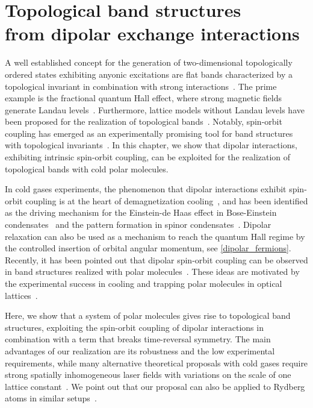 \chapter[Topological band structures from dipolar exchange interactions]{Topological band structures\texorpdfstring{\\}{ }from dipolar exchange interactions}
\label{topological_bands}

A well established concept for the generation of two-dimensional topologically ordered states exhibiting anyonic excitations are flat bands characterized by a topological invariant in combination with strong interactions~\cite{Bergholtz2013,Parameswaran2013}.
The prime example is the fractional quantum Hall effect, where strong magnetic fields generate Landau levels~\cite{Nayak2008}.
Furthermore, lattice models without Landau levels have been proposed for the realization of topological bands~\cite{Haldane1988,Raghu2008,Wang2011,Neupert2011,Wang2012a,Grushin2012,Moller2009,Sun2010,Barkeshli2012,Wang2011a,Sterdyniak2013,Liu2012,Yao2013,Yang2012,Dauphin2012,Cooper2012,Cooper2013,Shi2013,Yao2015}.
Notably, spin-orbit coupling has emerged as an experimentally promising tool for band structures with topological invariants~\cite{Kane2005,Pesin2009,Qi2011,Hasan2010,Tang2011,Qiao2011}.
In this chapter, we show that dipolar interactions, exhibiting intrinsic spin-orbit coupling, can be exploited for the realization of topological bands with cold polar molecules.

In cold gases experiments, the phenomenon that dipolar interactions exhibit spin-orbit coupling is at the heart of demagnetization cooling~\cite{Hensler2003,Fattori2006,Pasquiou2011,DePaz2013a},
and has been identified as the driving mechanism for the Einstein-de Haas effect in Bose-Einstein condensates~\cite{Kawaguchi2006} and the pattern formation in spinor condensates~\cite{Santos2006,Vengalattore2008,Kurn2013}.
Dipolar relaxation can also be used as a mechanism to reach the quantum Hall regime by the controlled insertion of orbital angular momentum, see \cref{dipolar_fermions}.
Recently, it has been pointed out that dipolar spin-orbit coupling can be observed in band structures realized with polar molecules~\cite{Syzranov2014}.
These ideas are motivated by the experimental success in cooling and trapping polar molecules in optical lattices~\cite{Ni2008b,Yan2013}.

Here, we show that a system of polar molecules gives rise to topological band structures, exploiting the spin-orbit coupling of dipolar interactions in combination with a term that breaks time-reversal symmetry.
The main advantages of our realization are its robustness and the low experimental requirements, while many alternative theoretical proposals with cold gases require strong spatially inhomogeneous laser fields with variations on the scale of one lattice constant~\cite{Liu2010,Stanescu2010,Goldman2013,Li2008,Yao2012,Yao2013,Goldman2013,Jaksch2003,Yao2015}.
We point out that our proposal can also be applied to Rydberg atoms in similar setups~\cite{Barredo2014,Piotrowicz2013,Nogrette2014}.

